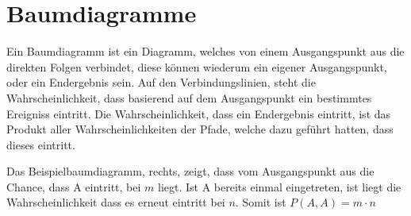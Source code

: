 \documentclass{article}
\begin{document}
 
\section{Baumdiagramme}
\begin{minipage}{\dimexpr\linewidth-5cm} 
 Ein Baumdiagramm ist ein Diagramm, welches von einem Ausgangspunkt aus die direkten Folgen verbindet, diese können wiederum ein eigener Ausgangspunkt, oder ein Endergebnis sein. Auf den Verbindungslinien, steht die Wahrscheinlichkeit, dass basierend auf dem Ausgangspunkt ein bestimmtes Ereigniss eintritt. Die Wahrscheinlichkeit, dass ein Endergebnis eintritt, ist das Produkt aller Wahrscheinlichkeiten der Pfade, welche dazu geführt hatten, dass dieses eintritt.
\end{minipage}
\hfill
\begin{minipage}{5cm}
 \center
\end{minipage}
\vspace{-0.35em} \newline
Das Beispielbaumdiagramm, rechts, zeigt, dass vom Ausgangspunkt aus die Chance, dass A eintritt, bei $m$ liegt. Ist A bereits einmal eingetreten, ist liegt die Wahrscheinlichkeit dass es erneut eintritt bei $n$. Somit ist $P(A, A) = m \cdot n$ 
 
 
\end{document}
